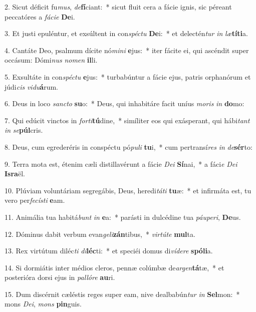 2. Sicut déficit fu\textit{mus}, \textit{de}\textbf{fí}ciant:~*  sicut fluit cera a fácie ignis, sic péreant peccatóres a \textit{fá}\textit{ci}\textit{e} \textbf{De}i.\

3. Et justi epuléntur, et exsúltent in con\textit{spéc}\textit{tu} \textbf{De}i:~*  et delectén\textit{tur} \textit{in} \textit{læ}\textbf{tí}\textbf{ti}a.\

4. Cantáte Deo, psalmum dícite nó\textit{mi}\textit{ni} \textbf{e}jus:~*  iter fácite ei, qui ascéndit super occásum: Dómi\textit{nus} \textit{no}\textit{men} \textbf{il}li.\

5. Exsultáte in con\textit{spéc}\textit{tu} \textbf{e}jus:~*  turbabúntur a fácie ejus, patris orphanórum et júdi\textit{cis} \textit{vi}\textit{du}\textbf{á}rum.\

6. Deus in loco \textit{sanc}\textit{to} \textbf{su}o:~*  Deus, qui inhabitáre facit uníus \textit{mo}\textit{ris} \textit{in} \textbf{do}mo:\

7. Qui edúcit vinctos in \textit{for}\textit{ti}\textbf{tú}dine,~*  simíliter eos qui exásperant, qui hábi\textit{tant} \textit{in} \textit{se}\textbf{púl}cris.\

8. Deus, cum egrederéris in conspéctu pó\textit{pu}\textit{li} \textbf{tu}i,~*  cum pertransí\textit{res} \textit{in} \textit{de}\textbf{sér}to:\

9. Terra mota est, étenim cæli distillavérunt a fácie \textit{De}\textit{i} \textbf{Sí}nai,~*  a fáci\textit{e} \textit{De}\textit{i} \textbf{Is}\textbf{ra}ël.\

10. Plúviam voluntáriam segregábis, Deus, heredi\textit{tá}\textit{ti} \textbf{tu}æ:~*  et infirmáta est, tu vero per\textit{fe}\textit{cís}\textit{ti} \textbf{e}am.\

11. Animália tua habitá\textit{bunt} \textit{in} \textbf{e}a:~*  parásti in dulcédine tua \textit{páu}\textit{pe}\textit{ri}, \textbf{De}us.\

12. Dóminus dabit verbum evan\textit{ge}\textit{li}\textbf{zán}tibus,~*  \textit{vir}\textit{tú}\textit{te} \textbf{mul}ta.\

13. Rex virtútum diléc\textit{ti} \textit{di}\textbf{léc}ti:~*  et speciéi domus di\textit{ví}\textit{de}\textit{re} \textbf{spó}\textbf{li}a.\

14. Si dormiátis inter médios cleros, pennæ colúmbæ de\textit{ar}\textit{gen}\textbf{tá}tæ,~*  et posterióra dorsi ejus in \textit{pal}\textit{ló}\textit{re} \textbf{au}ri.\

15. Dum discérnit cæléstis reges super eam, nive dealbabún\textit{tur} \textit{in} \textbf{Sel}mon:~*  mons \textit{De}\textit{i}, \textit{mons} \textbf{pin}guis.\

